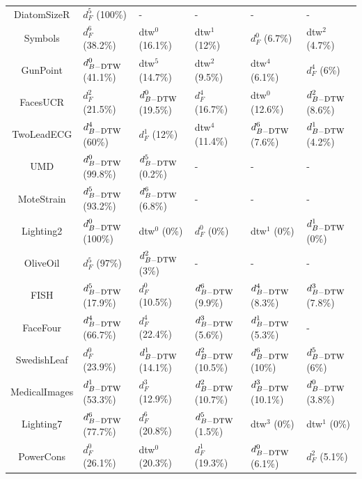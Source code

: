 \begin{table}[h!]
{\begin{tabular}{| c |  l l l l l |}
			\\
			DiatomSizeR 		& $d_F^5$ (100\%) & - & - & -  & - 
			\\			
			Symbols 			& $d_F^6$ (38.2\%) & {\sc dtw}$^0$ (16.1\%) & {\sc dtw}$^1$ (12\%) &$d_F^0$ (6.7\%) &{\sc dtw}$^2$ (4.7\%)	
			\\			
			GunPoint			& $d_{B-\mbox{\sc dtw}}^0$ (41.1\%) &{\sc dtw}$^5$ (14.7\%) &{\sc dtw}$^2$ (9.5\%) & {\sc dtw}$^4$ (6.1\%) & $d_F^4$ (6\%)	
			\\			
			FacesUCR			& $d_F^2$ (21.5\%)&   $d_{B-\mbox{\sc dtw}}^0$ (19.5\%)&   $d_F^4$ (16.7\%)&   {\sc dtw}$^0$ (12.6\%)&   $d_{B-\mbox{\sc dtw}}^2$ (8.6\%)
			\\			
			TwoLeadECG 			& $d_{B-\mbox{\sc dtw}}^4$ (60\%)&   $d_F^1$ (12\%)&   {\sc dtw}$^4$ (11.4\%)&   $d_{B-\mbox{\sc dtw}}^6$ (7.6\%)&   $d_{B-\mbox{\sc dtw}}^1$ (4.2\%)
			\\			
			UMD 				& $d_{B-\mbox{\sc dtw}}^0$ (99.8\%) &$d_{B-\mbox{\sc dtw}}^5$ (0.2\%) & - & - & -
			\\			
			MoteStrain			& $d_{B-\mbox{\sc dtw}}^5$ (93.2\%)&   $d_{B-\mbox{\sc dtw}}^6$ (6.8\%)& -  & - & -
			\\
			Lighting2			& $d_{B-\mbox{\sc dtw}}^0$ (100\%) & {\sc dtw}$^0$ (0\%) & $d_F^0$ (0\%) & {\sc dtw}$^1$ (0\%) & $d_{B-\mbox{\sc dtw}}^1$ (0\%)
			\\			
			OliveOil			& $d_F^5$ (97\%)&   $d_{B-\mbox{\sc dtw}}^2$ (3\%)   & - & - & -
			\\						
			FISH				& $d_{B-\mbox{\sc dtw}}^5$ (17.9\%)&   $d_F^0$ (10.5\%)&   $d_{B-\mbox{\sc dtw}}^6$ (9.9\%)&   $d_{B-\mbox{\sc dtw}}^4$ (8.3\%)&   $d_{B-\mbox{\sc dtw}}^3$ (7.8\%)  
			\\
			FaceFour			& $d_{B-\mbox{\sc dtw}}^4$ (66.7\%) &$d_F^4$ (22.4\%) & $d_{B-\mbox{\sc dtw}}^3$ (5.6\%) &$d_{B-\mbox{\sc dtw}}^1$ (5.3\%) & -
			\\
			SwedishLeaf			& $d_F^0$ (23.9\%) &$d_{B-\mbox{\sc dtw}}^1$ (14.1\%) &$d_{B-\mbox{\sc dtw}}^2$ (10.5\%) &$d_{B-\mbox{\sc dtw}}^6$ (10\%) &$d_{B-\mbox{\sc dtw}}^5$ (6\%)	
			\\
			MedicalImages		& $d_{B-\mbox{\sc dtw}}^1$ (53.3\%)&   $d_F^3$ (12.9\%)&   $d_{B-\mbox{\sc dtw}}^2$ (10.7\%)&   $d_{B-\mbox{\sc dtw}}^3$ (10.1\%)&   $d_{B-\mbox{\sc dtw}}^0$ (3.8\%)   
			\\
			Lighting7			& $d_{B-\mbox{\sc dtw}}^6$ (77.7\%) &$d_F^6$ (20.8\%) &$d_{B-\mbox{\sc dtw}}^5$ (1.5\%) &{\sc dtw}$^3$ (0\%) &{\sc dtw}$^1$ (0\%)		
			\\
			PowerCons			& $d_F^0$ (26.1\%)&   {\sc dtw}$^0$ (20.3\%)&   $d_F^1$ (19.3\%)&   $d_{B-\mbox{\sc dtw}}^0$ (6.1\%)&   $d_F^2$ (5.1\%) 

\end{tabular}}
\end{table}
